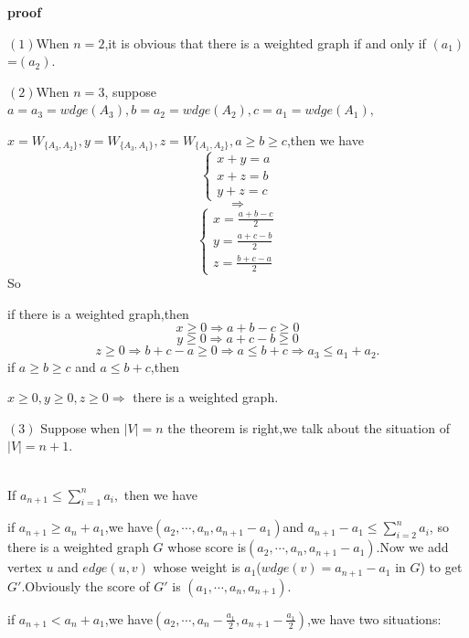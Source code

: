 \documentclass{article} %
\begin{document}
        \textbf{proof}\par 
        $(1)$When $n=2$,it is obvious that there is a weighted graph if and only if $(a_1)$=$(a_2)$.\par
        $(2)$When $n=3$,
        suppose $a=a_3=wdge(A_3),b=a_2=wdge(A_2),c=a_1=wdge(A_1),$\par
        $x=W_{\{A_3,A_2\}},y=W_{\{A_3,A_1\}},z=W_{\{A_1,A_2\}},a\ge b \ge c$,then we have
        \begin{equation}
        \begin{cases}
        x+y=a\\
        x+z=b\\
        y+z=c
        \end{cases}
        \end{equation}
        $$\Rightarrow$$
        \begin{equation}
        \begin{cases}
        x=\frac{a+b-c}{2}\\
        y=\frac{a+c-b}{2}\\
        z=\frac{b+c-a}{2}
        \end{cases}
        \end{equation}
        So\par
        if there is a weighted graph,then
        $$
        x\ge0 \Rightarrow a+b-c \ge0
        $$
        $$
        y\ge0 \Rightarrow a+c-b \ge0
        $$
        $$
        z\ge0 \Rightarrow b+c-a \ge0 \Rightarrow a \leq b+c \Rightarrow a_3 \leq a_1+a_2.
        $$
        if $a\ge b\ge c$ and $a\leq b+c$,then\par
        $x \ge0,y\ge0,z\ge0 \Rightarrow$ there is a weighted graph.\par
        $(3)$
        Suppose when $|V|=n$ the theorem is right,we talk about the situation of $|V|=n+1$.\par
        ~\\
        If $a_{n+1} \leq \sum_{i=1}^{n}a_i,$ then we have\par
        \par
        if $a_{n+1}\ge a_n+a_1$,we have$(a_2,\cdots,a_n,a_{n+1}-a_1)$and $a_{n+1}-a_1\leq \sum_{i=2}^{n}a_i$,
        so there is a weighted graph $G$ whose score is$(a_2,\cdots,a_n,a_{n+1}-a_1)$.Now we add vertex $u$ and $edge(u,v)$ whose weight is $a_1$($wdge(v)=a_{n+1}-a_1$ in $G$) to get $G\prime$.Obviously the score of $G\prime$ is $(a_1,\cdots,a_n,a_{n+1})$.\par
        if $a_{n+1}<a_n+a_1$,we have$(a_2,\cdots,a_n-\frac{a_1}{2},a_{n+1}-\frac{a_1}{2})$,we have two situations:\par
\end{document}

